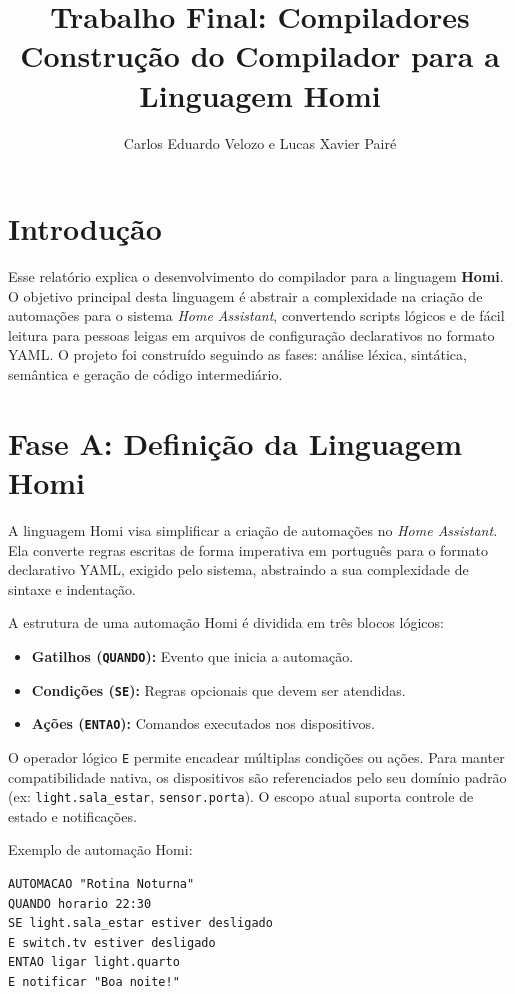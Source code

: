 \documentclass[12pt, a4paper]{article}
\title{\textbf{Trabalho Final: Compiladores}\\Construção do Compilador para a Linguagem Homi}
\author{Carlos Eduardo Velozo e Lucas Xavier Pairé}
\date{}
\begin{document}
\maketitle
\tableofcontents
\newpage

\section{Introdução}
Esse relatório explica o desenvolvimento do compilador para a linguagem \textbf{Homi}. O objetivo principal desta linguagem é abstrair a complexidade na criação de automações para o sistema \textit{Home Assistant}, convertendo scripts lógicos e de fácil leitura para pessoas leigas em arquivos de configuração declarativos no formato YAML. O projeto foi construído seguindo as fases: análise léxica, sintática, semântica e geração de código intermediário.

\section{Fase A: Definição da Linguagem Homi}
A linguagem Homi visa simplificar a criação de automações no \textit{Home Assistant}. Ela converte regras escritas de forma imperativa em português para o formato declarativo YAML, exigido pelo sistema, abstraindo a sua complexidade de sintaxe e indentação.

A estrutura de uma automação Homi é dividida em três blocos lógicos:
\begin{itemize}
    \item \textbf{Gatilhos (\texttt{QUANDO}):} Evento que inicia a automação.
    \item \textbf{Condições (\texttt{SE}):} Regras opcionais que devem ser atendidas.
    \item \textbf{Ações (\texttt{ENTAO}):} Comandos executados nos dispositivos.
\end{itemize}

O operador lógico \texttt{E} permite encadear múltiplas condições ou ações. Para manter compatibilidade nativa, os dispositivos são referenciados pelo seu domínio padrão (ex: \texttt{light.sala\_estar}, \texttt{sensor.porta}). O escopo atual suporta controle de estado e notificações.

Exemplo de automação Homi:
\begin{lstlisting}
AUTOMACAO "Rotina Noturna"
QUANDO horario 22:30
SE light.sala_estar estiver desligado
E switch.tv estiver desligado
ENTAO ligar light.quarto
E notificar "Boa noite!"
\end{lstlisting}
\end{document}
